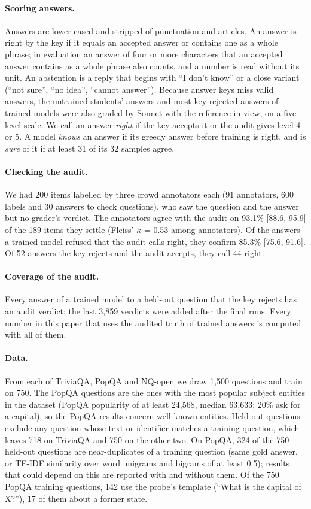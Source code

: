\documentclass[11pt,a4paper,twocolumn]{article}
\begin{document}
\paragraph{Scoring answers.} Answers are lower-cased and stripped of punctuation and articles. An answer is right by the key if it equals an accepted answer or contains one as a whole phrase; in evaluation an answer of four or more characters that an accepted answer contains as a whole phrase also counts, and a number is read without its unit. An abstention is a reply that begins with ``I don't know'' or a close variant (``not sure'', ``no idea'', ``cannot answer''). Because answer keys miss valid answers, the untrained students' answers and most key-rejected answers of trained models were also graded by Sonnet with the reference in view, on a five-level scale. We call an answer \emph{right} if the key accepts it or the audit gives level 4 or 5. A model \emph{knows} an answer if its greedy answer before training is right, and is \emph{sure} of it if at least 31 of its 32 samples agree.

\paragraph{Checking the audit.} We had 200 items labelled by three crowd annotators each (91 annotators, 600 labels and 30 answers to check questions), who saw the question and the answer but no grader's verdict. The annotators agree with the audit on 93.1\% [88.6, 95.9] of the 189 items they settle (Fleiss' $\kappa$ = 0.53 among annotators). Of the answers a trained model refused that the audit calls right, they confirm 85.3\% [75.6, 91.6]. Of 52 answers the key rejects and the audit accepts, they call 44 right.

\paragraph{Coverage of the audit.} Every answer of a trained model to a held-out question that the key rejects has an audit verdict; the last 3{,}859 verdicts were added after the final runs. Every number in this paper that uses the audited truth of trained answers is computed with all of them.

\paragraph{Data.} From each of TriviaQA, PopQA and NQ-open we draw 1{,}500 questions and train on 750. The PopQA questions are the ones with the most popular subject entities in the dataset (PopQA popularity of at least 24{,}568, median 63{,}633; 20\% ask for a capital), so the PopQA results concern well-known entities. Held-out questions exclude any question whose text or identifier matches a training question, which leaves 718 on TriviaQA and 750 on the other two. On PopQA, 324 of the 750 held-out questions are near-duplicates of a training question (same gold answer, or TF-IDF similarity over word unigrams and bigrams of at least 0.5); results that could depend on this are reported with and without them. Of the 750 PopQA training questions, 142 use the probe's template (``What is the capital of X?''), 17 of them about a former state.
\end{document}
